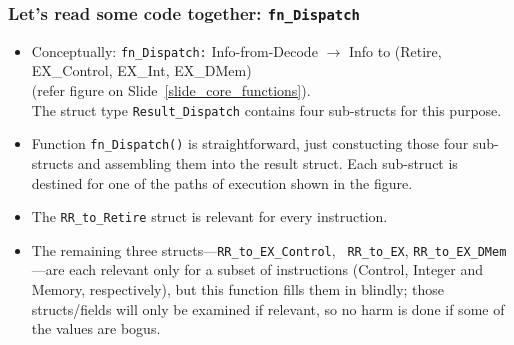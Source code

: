 \begin{frame}[fragile]
\frametitle{Let's read some code together: {\tt fn\_Dispatch}}

\begin{center}\scriptsize


 \vspace{1ex}

 \begin{minipage}{0.8\textwidth}
  \begin{itemize}

   \item Conceptually: {\tt fn\_Dispatch:} Info-from-Decode $\rightarrow$ Info to (Retire, EX\_Control, EX\_Int, EX\_DMem) \\
     (refer figure on Slide~\ref{slide_core_functions}). \\
     The struct type {\tt Result\_Dispatch} contains four sub-structs for this purpose.

   \item Function {\tt fn\_Dispatch()} is straightforward, just
     constucting those four sub-structs and assembling them into the
     result struct.  Each sub-struct is destined for one of the paths
     of execution shown in the figure.

   \item The {\tt RR\_to\_Retire} struct is relevant for every instruction.

   \item The remaining three structs---{\tt RR\_to\_EX\_Control}, {\tt
     RR\_to\_EX}, {\tt RR\_to\_EX\_DMem}---are each relevant only for
     a subset of instructions (Control, Integer and Memory,
     respectively), but this function fills them in blindly; those
     structs/fields will only be examined if relevant, so no harm is
     done if some of the values are bogus.

  \end{itemize}

 \end{minipage}
\end{center}

\end{frame}

